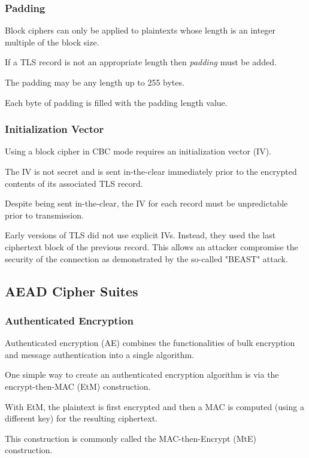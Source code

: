 \documentclass[aspectratio=169]{beamer}
\begin{document}
%	
%	

\begin{frame}[triangle=siiblue]
	\frametitle{Padding}
	Block ciphers can only be applied to plaintexts whose length is an integer multiple of the block size.
	
	\vfill
	
	If a TLS record is not an appropriate length then \emph{padding} must be added.

	\vfill
	
	The padding may be any length up to 255 bytes.
	
	\vfill
	
	Each byte of padding is filled with the padding length value.
\end{frame}

\begin{frame}[triangle=siiblue]
	\frametitle{Initialization Vector}
	Using a block cipher in CBC mode requires an initialization vector (IV).
	
	\vfill
	
	The IV is not secret and is sent in-the-clear immediately prior to the encrypted contents of its associated TLS record.
	
	\vfill
	
	Despite being sent in-the-clear, the IV for each record must be unpredictable prior to transmission.
	
	\vfill
	
	Early versions of TLS did not use explicit IVs. Instead, they used the last ciphertext block of the previous record. This allows an attacker compromise the security of the connection as demonstrated by  the so-called "BEAST" attack.

\end{frame}
\subsection{AEAD Cipher Suites}
\begin{frame}[triangle=siiblue]
	\frametitle{Authenticated Encryption}
	Authenticated encryption (AE) combines the functionalities of bulk encryption and message authentication into a single algorithm.
	
	\vfill
	
	One simple way to create an authenticated encryption algorithm is via the encrypt-then-MAC (EtM) construction.
	
	\vfill
	
	With EtM, the plaintext is first encrypted and then a MAC is computed (using a different key) for the resulting ciphertext. 
	
	\vfill
	
	This construction is commonly called the MAC-then-Encrypt (MtE) construction.
\end{frame}
\end{document}
